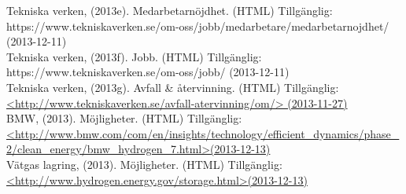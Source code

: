 \documentclass[10pt,a4paper]{article}
\begin{document}
Tekniska verken, (2013e). Medarbetarnöjdhet. (HTML) Tillgänglig: \\
https://www.tekniskaverken.se/om-oss/jobb/medarbetare/medarbetarnojdhet/ (2013-12-11)\\

Tekniska verken, (2013f). Jobb. (HTML) Tillgänglig: \\
https://www.tekniskaverken.se/om-oss/jobb/ (2013-12-11)\\

Tekniska verken, (2013g). Avfall \& återvinning. (HTML) Tillgänglig: \\
\hyperref{http://www.tekniskaverken.se/avfall-atervinning/om/}{}{}{<http://www.tekniskaverken.se/avfall-atervinning/om/> (2013-11-27)} \\


BMW, (2013). Möjligheter. (HTML) Tillgänglig: \\
\hyperref{http://www.bmw.com/com/en/insights/technology/efficient_dynamics/phase_2/clean_energy/bmw_hydrogen_7.html}{}{}{<http://www.bmw.com/com/en/insights/technology/efficient\_dynamics/phase\_2/clean\_energy/bmw\_hydrogen\_7.html>(2013-12-13)}\\

Vätgas lagring, (2013). Möjligheter. (HTML) Tillgänglig: \\
\hyperref{http://www.hydrogen.energy.gov/storage.html}{}{}{<http://www.hydrogen.energy.gov/storage.html>(2013-12-13)}\\
\end{document}
